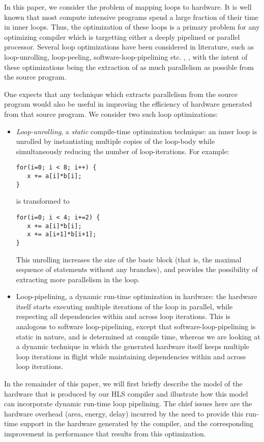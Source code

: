 \documentclass[conference]{IEEEtran}
\begin{document}
In this paper, we consider the problem of mapping loops to hardware.  It
is well known that most compute intensive programs spend a large fraction
of their time in inner loops.  Thus, the optimization of these loops is
a primary problem for any optimizing compiler which is targetting
either a deeply pipelined or parallel processor.  Several loop optimizations
have been considered in literature, such as loop-unrolling, loop-peeling,
software-loop-pipelining etc. \cite{wolfe}, \cite{muchnick}, with the intent of
these optimizations being the extraction of as much
parallelism as possible from the source program. 

One expects that any technique which extracts parallelism from
the source program would also be useful in improving the efficiency
of hardware generated from that source program.  We consider two
such loop optimizations:
\begin{itemize}
\item {\em Loop-unrolling}, a {\em static} compile-time optimization technique:  
an inner loop is unrolled by instantiating multiple copies of the loop-body
while simultaneously reducing the number of loop-iterations.  For example:
\begin{verbatim}
for(i=0; i < 8; i++) {
   x += a[i]*b[i];
}
\end{verbatim}
is transformed to
\begin{verbatim}
for(i=0; i < 4; i+=2) {
   x += a[i]*b[i];
   x += a[i+1]*b[i+1];
}
\end{verbatim}
This unrolling increases the size of the basic block (that is, the maximal sequence of
statements without any branches), and provides the possibility of extracting more
parallelism in the loop.
\item {Loop-pipelining}, a {dynamic} run-time optimization in hardware:  the hardware
itself starts executing multiple iterations of the loop in parallel, while respecting
all dependencies within and across loop iterations.   This is analogous to software
loop-pipelining, except that software-loop-pipelining is static in nature, and is
determined at compile time, whereas we are looking at a dynamic technique in which
the generated hardware itself keeps multiple loop iterations in flight while maintaining
dependencies within and across loop iterations.
\end{itemize}

In the remainder of this paper, we will first briefly describe the model of
the hardware that is produced by our HLS compiler and illustrate how this model
can incorporate dynamic run-time loop pipelining.  The chief issues here are the
hardware overhead (area, energy, delay) incurred by the need to provide 
this run-time support in the hardware generated by the compiler, and
the corresponding improvement in performance that results from this optimization.
\end{document}
